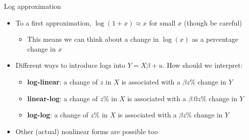 \documentclass[aspectratio=169]{beamer}
\begin{document}
\begin{frame}{Log approximation}
    \begin{itemize}
        \item To a first approximation, $\log(1+x) \approx x$ for small $x$ (though be careful)
        \begin{itemize}
            \item This means we can think about a change in $\log(x)$ as a percentage change in $x$
        \end{itemize}
        \item Different ways to introduce logs into $Y=X\beta + u$. How should we interpret:
        \begin{itemize}
            \item \textbf{log-linear}: a change of $z$ in $X$ is associated with a $\beta z \%$ change in $Y$
            \item \textbf{linear-log}: a change of $z\%$ in $X$ is associated with a $\beta .0z \%$ change in $Y$
            \item \textbf{log-log}: a change of $z\%$ in $X$ is associated with a $\beta z \%$ change in $Y$
        \end{itemize}
        \item Other (actual) nonlinear forms are possible too
    \end{itemize}
\end{frame}

\end{document}
